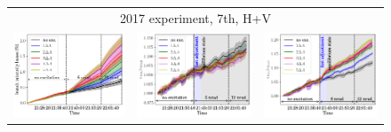 \documentclass[%
 reprint,
 amsmath,amssymb,
 aps,
prstab,
longbibliography
]{revtex4-1}
\newlength{\thirdwidth}
\begin{document}
\begin{figure}
\begin{tabular}{ccc}
    \multicolumn{3}{c}{2017 experiment, 7th, H+V} \\
    \includegraphics[width=\thirdwidth]{2017_bunch_intensity_hv7th_no_damper_avg.png} &
    \includegraphics[width=\thirdwidth]{2017_emith_avg_rel_hv7th_no_damper.png} &
    \includegraphics[width=\thirdwidth]{2017_emitv_avg_rel_hv7th_no_damper.png} \\

\end{tabular}
\end{figure}
\end{document}
